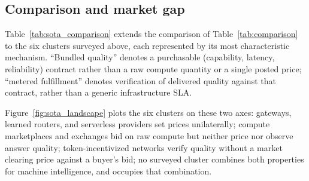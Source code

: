 \subsection{Comparison and market gap}
\label{sec:sota_gap}

Table~\ref{tab:sota_comparison} extends the comparison of
Table~\ref{tab:comparison} to the six clusters surveyed above, each
represented by its most characteristic mechanism. ``Bundled quality''
denotes a purchasable (capability, latency, reliability) contract rather
than a raw compute quantity or a single posted price; ``metered
fulfillment'' denotes verification of delivered quality against that
contract, rather than a generic infrastructure SLA.

Figure~\ref{fig:sota_landscape} plots the six clusters on these two
axes: gateways, learned routers, and serverless providers set prices
unilaterally; compute marketplaces and exchanges bid on raw compute but
neither price nor observe answer quality; token-incentivized networks
verify quality without a market clearing price against a buyer's bid; no
surveyed cluster combines both properties for machine intelligence, and
\Noesis{} occupies that combination.

